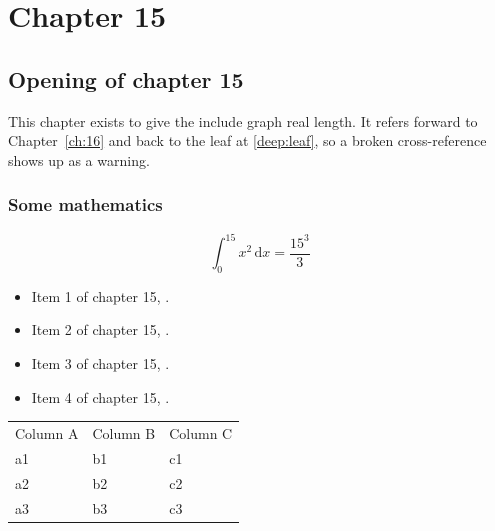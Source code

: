\chapter{Chapter 15}
\label{ch:15}
\section{Opening of chapter 15}
This chapter exists to give the include graph real length. It refers
forward to Chapter~\ref{ch:16} and back to the leaf
at \ref{deep:leaf}, so a broken cross-reference shows up as a warning.

\subsection{Some mathematics}
\begin{equation}
  \int_0^{15} x^{2} \, \mathrm{d}x = \frac{15^{3}}{3}
\end{equation}

\begin{itemize}
  \item Item 1 of chapter 15, .
  \item Item 2 of chapter 15, .
  \item Item 3 of chapter 15, .
  \item Item 4 of chapter 15, .
\end{itemize}

\begin{tabular}{lll}
  Column A & Column B & Column C \\
  a1 & b1 & c1 \\
  a2 & b2 & c2 \\
  a3 & b3 & c3 \\
\end{tabular}
